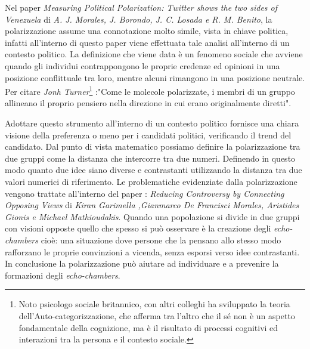 Nel paper \textit{Measuring Political Polarization: Twitter shows the two sides of Venezuela} di \textit{A. J. Morales, J. Borondo, J. C. Losada e R. M. Benito}, la polarizzazione assume una connotazione molto simile, vista in chiave politica, infatti all'interno di questo paper viene effettuata tale analisi all'interno di un contesto politico. 
La definizione che viene data è un fenomeno sociale che avviene quando gli individui contrappongono le proprie credenze ed opinioni in una posizione conflittuale tra loro, mentre alcuni rimangono in una posizione neutrale.
Per citare \textit{Jonh Turner}\footnote{Noto psicologo sociale britannico, con altri colleghi ha sviluppato la teoria dell'Auto-categorizzazione, che afferma tra l'altro che il sé non è un aspetto fondamentale della cognizione, ma è il risultato di processi cognitivi ed interazioni tra la persona e il contesto sociale.} :"Come le molecole polarizzate, i membri di un gruppo allineano il proprio pensiero nella direzione in cui erano originalmente diretti". 

Adottare questo strumento all'interno di un contesto politico fornisce una chiara visione della preferenza o meno per i candidati politici, verificando il trend del candidato.
Dal punto di vista matematico possiamo definire la polarizzazione tra due gruppi come la distanza che intercorre tra due numeri. Definendo in questo modo quanto due idee siano diverse e contrastanti utilizzando la distanza tra due valori numerici di riferimento.
Le problematiche evidenziate dalla polarizzazione vengono trattate all'interno del paper : \textit{Reducing Controversy by Connecting Opposing Views} di \textit{Kiran Garimella ,Gianmarco De Francisci Morales, Aristides Gionis e Michael Mathioudakis}. Quando una popolazione si divide in due gruppi con visioni opposte quello che spesso si può osservare è la creazione degli \textit{echo-chambers} cioè: una situazione dove persone che la pensano allo stesso modo rafforzano le proprie convinzioni a vicenda, senza esporsi verso idee contrastanti.
In conclusione la polarizzazione può aiutare ad individuare e a prevenire la formazioni degli \textit{echo-chambers}.

